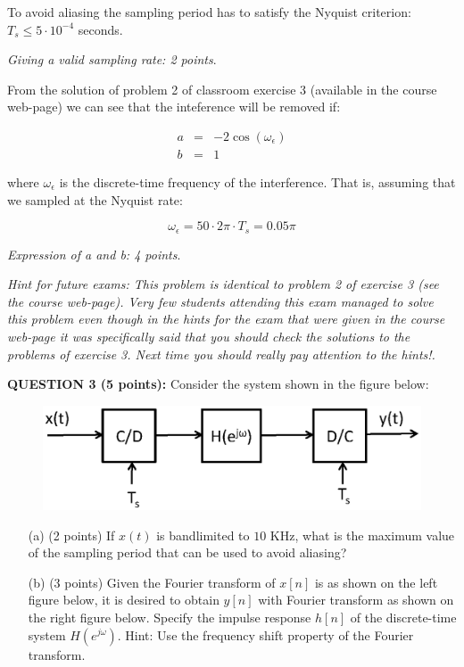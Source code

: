 \documentclass[a4paper,11pt,oneside]{article}
\begin{document}
To avoid aliasing the sampling period has to satisfy the Nyquist criterion: $T_s\leq 5\cdot 10^{-4}$ seconds. 

\emph{Giving a valid sampling rate: 2 points}.

From the solution of problem 2 of classroom exercise 3 (available in the course web-page) we can see that the inteference will be removed if:

\begin{eqnarray}
a &=& -2\cos (\omega_\epsilon)\\
b &=& 1
\end{eqnarray}

where $\omega_\epsilon$ is the discrete-time frequency of the interference. That is, assuming that we sampled at the Nyquist rate:

\[
\omega_\epsilon=50\cdot 2\pi \cdot T_s=0.05\pi
\]

\emph{Expression of a and b: 4 points}.

\emph{Hint for future exams: This problem is identical to problem 2 of exercise 3 (see the course web-page). Very few students attending this exam managed to solve this problem even though in the hints for the exam that were given in the course web-page it was specifically said that you should check the solutions to the problems of exercise 3. Next time you should really pay attention to the hints!.} 


\vspace{1cm}

\textbf{QUESTION 3 (5 points):} Consider the system shown in the figure below:

\begin{figure}[h!]
\centering
\includegraphics[width=.8\textwidth]{fig3.eps}
\end{figure}

\begin{itemize}
\item[(a)] (2 points) If $x(t)$ is bandlimited to $10$ KHz, what is the maximum value of the sampling period that can be used to avoid aliasing?
\item[(b)] (3 points) Given the Fourier transform of $x[n]$ is as shown on the left figure below, it is desired to obtain $y[n]$ with Fourier transform as shown on the right figure below. Specify the impulse response $h[n]$ of the discrete-time system $H(e^{j\omega})$. Hint: Use the frequency shift property of the Fourier transform.
\end{itemize}
\end{document}

